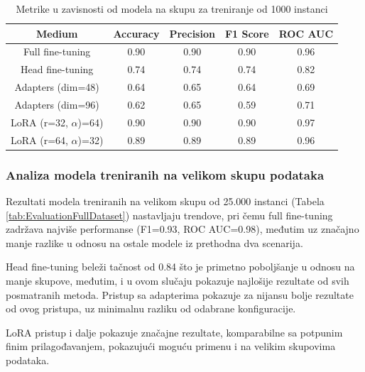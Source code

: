 \documentclass[12pt,oneside]{memoir}
\begin{document}
\begin{table}[h!]
	\centering
	\setlength{\tabcolsep}{12pt}
	\renewcommand{\arraystretch}{1.5}
	\begin{tabular}{|c|c|c|c|c|} 
		\hline
		\textbf{Medium} & \textbf{Accuracy} & \textbf{Precision} & \textbf{F1 Score} & \textbf{ROC AUC}  \\
		\hline
		Full fine-tuning     & 0.90 & 0.90 & 0.90 & 0.96 \\ 
		Head fine-tuning     & 0.74 & 0.74 & 0.74 & 0.82 \\ 
		Adapters (dim=48)  & 0.64 & 0.65 & 0.64 & 0.69 \\ 
		Adapters (dim=96)  & 0.62 & 0.65 & 0.59 & 0.71 \\ 
		LoRA (r=32, \(\alpha\))=64)    & 0.90 & 0.90 & 0.90 & 0.97 \\ 
		LoRA (r=64, \(\alpha\))=32)    & 0.89 & 0.89 & 0.89 & 0.96 \\ 
		\hline
	\end{tabular}
	\caption{Metrike u zavisnosti od modela na skupu za treniranje od 1000 instanci}
	\label{tab:EvaluationMediumDataset}
\end{table}

\subsubsection{Analiza modela treniranih na velikom skupu podataka}
Rezultati modela treniranih na velikom skupu od 25.000 instanci (Tabela \ref{tab:EvaluationFullDataset}) nastavljaju trendove, pri čemu full fine-tuning zadržava najviše performanse (F1=0.93, ROC AUC=0.98), međutim uz značajno manje razlike u odnosu na ostale modele iz prethodna dva scenarija.

Head fine-tuning beleži tačnost od 0.84 što je primetno poboljšanje u odnosu na manje skupove, međutim, i u ovom slučaju pokazuje najlošije rezultate od svih posmatranih metoda. Pristup sa adapterima pokazuje za nijansu bolje rezultate od ovog pristupa, uz minimalnu razliku od odabrane konfiguracije. 

LoRA pristup i dalje pokazuje značajne rezultate, komparabilne sa potpunim finim prilagođavanjem, pokazujući moguću primenu i na velikim skupovima podataka.
\end{document}
